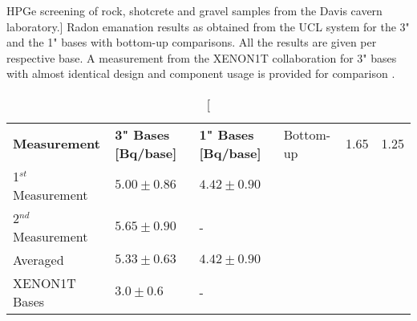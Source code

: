 \begin{table}[b]
\centering
\caption
[HPGe screening of rock, shotcrete and gravel samples from the Davis cavern laboratory.]
{Radon emanation results as obtained from the UCL system for the 3" and the 1" bases with bottom-up comparisons. All the results are given per respective base. A measurement from the XENON1T collaboration for 3" bases with almost identical design and component usage is provided for comparison \cite{Natascha}.}
\label{tab:pmt_base_results}
\vspace{1mm}
\renewcommand{\arraystretch}{1.2}
    \begin{tabularx}{.9\linewidth}{@{\extracolsep{\fill}}lll}
    \toprule
    
    \textbf{Measurement} & %
    \textbf{3" Bases [\micro{}Bq/base]} & %
    \textbf{1" Bases [\micro{}Bq/base]} & %
    
    \hline
    \hline
    
    Bottom-up 	        & 1.65              & 1.25          \\
    1$^{st}$ Measurement  & $5.00\pm0.86$     & $4.42\pm0.90$ \\       
    2$^{nd}$ Measurement	& $5.65\pm0.90$     & -             \\        
    \hline
    Averaged	        & $5.33\pm0.63$     & $4.42\pm0.90$ \\       
    XENON1T Bases       & $3.0\pm0.6$       & - \\
    
    \bottomrule
    \end{tabularx}
\end{table}

